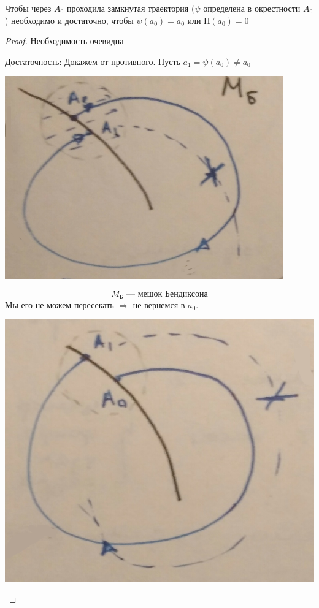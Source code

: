 	\begin{assertion}{\label{afKul}}
		Чтобы через $A_0$ проходила замкнутая траектория ($\psi$ определена в окрестности $A_0$)
			необходимо и достаточно, чтобы $\psi(a_0)=a_0$ или П$(a_0) = 0$
	\end{assertion}
	\begin{proof} Необходимость  очевидна \newline
	
		Достаточность: Докажем от противного. Пусть $a_1 =\psi(a_0) \neq a_0$ \newline
		\begin{minipage}{0.35\textwidth} 
			\vspace{3mm}
			\begin{center} \includegraphics[width=0.9\textwidth]{ch8/pict/pict_2_1.png} \end{center} 
			$$M_\text{Б}\text{ --- мешок Бендиксона}$$
			Мы его не можем пересекать $\Rightarrow$ \newline 
			\hspace*{15mm} не вернемся в $a_0$.
		\end{minipage}
			\hfill
		\begin{minipage}{0.32\textwidth}
			\begin{center} \includegraphics[width=1\textwidth]{ch8/pict/pict_2_2.png} \end{center} 

\end{minipage}
\end{proof}
